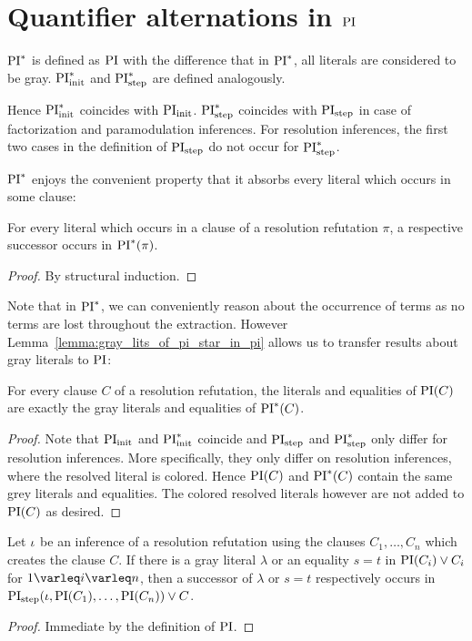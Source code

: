 \documentclass[%
	draft=false,%
	numbers=noendperiod,%
	11pt,%
	a4paper,%
	oneside,%
	openany,%
]{memoir}
\begin{document}
\section{Quantifier alternations in $\operatorname{PI}$}


\begin{defi}[$\PI^*$]
	$\PI^*$ is defined as $\operatorname{PI}$ with the difference that in $\PI^*$, all literals are considered to be gray.
	$\operatorname{PI}_{\mathrm{init}}^*$ and $\operatorname{PI}_{\mathrm{step}}^*$ are defined analogously.
\end{defi}

Hence $\operatorname{PI}_{\mathrm{init}}^*$ coincides with $\operatorname{PI}_{\mathrm{init}}$.
$\operatorname{PI}_{\mathrm{step}}^*$ coincides with $\operatorname{PI}_{\mathrm{step}}$ in case of factorization and paramodulation inferences.
For resolution inferences, the first two cases in the definition of $\operatorname{PI}_{\mathrm{step}}$ do not occur for $\operatorname{PI}_{\mathrm{step}}^*$.

$\PI^*$ enjoys the convenient property that it absorbs every literal which occurs in some clause:

\begin{prop}
	\label{prop:every_lit_in_pi_star}
	For every literal which occurs in a clause of a resolution refutation $\pi$, a respective successor occurs in $\operatorname{PI}^*(\pi)$.
\end{prop}
\begin{proof}
	By structural induction.
\end{proof}

Note that in $\PI^*$, we can conveniently reason about the occurrence of terms as no terms are lost throughout the extraction.
However Lemma~\ref{lemma:gray_lits_of_pi_star_in_pi} allows us to transfer results about gray literals to $\operatorname{PI}$:

\begin{lemma}
	\label{lemma:gray_lits_of_pi_star_in_pi}
	For every clause $C$ of a resolution refutation,
	the literals and equalities of $\operatorname{PI}(C)$ are exactly the gray literals and equalities of $\operatorname{PI}^*(C)$.
\end{lemma}
\begin{proof}
	Note that $\operatorname{PI}_{\mathrm{init}}$ and $\operatorname{PI}_{\mathrm{init}}^*$ coincide and $\operatorname{PI}_{\mathrm{step}}$ and $\operatorname{PI}_{\mathrm{step}}^*$ only differ for resolution inferences.
	More specifically, they only differ on resolution inferences, where the resolved literal is colored.
	Hence $\operatorname{PI}(C)$ and $\operatorname{PI}^*(C)$ contain the same grey literals and equalities.
	The colored resolved literals however are not added to $\operatorname{PI}(C)$ as desired.
\end{proof}


\begin{lemma}
	\label{lemma:Ot8Gie7y}
	Let $\iota$ be an inference of a resolution refutation using the clauses $C_1, \dots, C_n$ which creates the clause $C$.
	If there is a gray literal $\lambda$ or an equality $s=t$ in $\operatorname{PI}(C_i) \lor C_i$ for $1 \varleq i \varleq n$, 
	then a successor of $\lambda$ or $s=t$ respectively occurs in $\operatorname{PI}_{\mathrm{step}}(\iota, \operatorname{PI}(C_1), \dots, \operatorname{PI}(C_n)) \lor C$.
\end{lemma}
\begin{proof}
	Immediate by the definition of $\operatorname{PI}$.
\end{proof}
\end{document}

